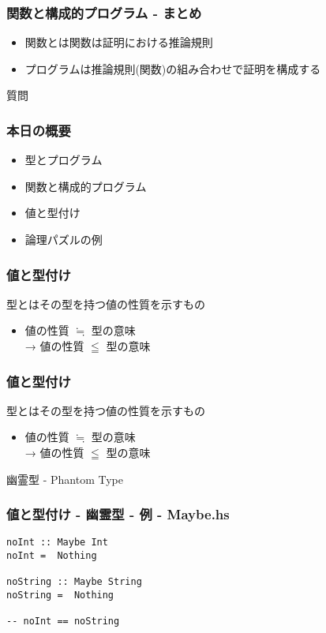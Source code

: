\documentclass[cjk,dvipdfm,14pt]{beamer}
\begin{document}
\begin{frame}[fragile]
\frametitle{関数と構成的プログラム - まとめ}

\begin{itemize}
\item 関数とは関数は証明における推論規則
\item プログラムは推論規則(関数)の組み合わせで証明を構成する
\end{itemize}

\end{frame}

\begin{frame}[fragile]
質問
\end{frame}

\begin{frame}[fragile]
\frametitle{本日の概要}

\begin{itemize}
\item 型とプログラム
\item 関数と構成的プログラム
\item { \color{red} 値と型付け }
\item 論理パズルの例
\end{itemize}

\end{frame}

\begin{frame}[fragile]
\frametitle{値と型付け}

型とはその型を持つ値の性質を示すもの
\begin{itemize}
\item 値の性質 $\fallingdotseq $ 型の意味\\
 → { \color{red} 値の性質 $\leqq $ 型の意味 }
\end{itemize}

\end{frame}

\begin{frame}[fragile]
\frametitle{値と型付け}

型とはその型を持つ値の性質を示すもの
\begin{itemize}
\item 値の性質 $\fallingdotseq $ 型の意味\\
 → 値の性質 $\leqq $ 型の意味
\end{itemize}
{ \color{red} 幽霊型 - Phantom Type }

\end{frame}

\begin{frame}[fragile]
\frametitle{値と型付け - 幽霊型 - 例 - Maybe.hs}

\begin{lstlisting}
noInt :: Maybe Int
noInt =  Nothing

noString :: Maybe String
noString =  Nothing

-- noInt == noString
\end{lstlisting}

\end{frame}
\end{document}
